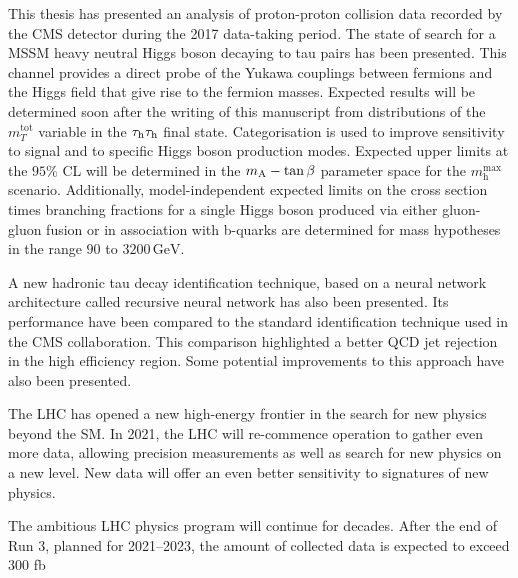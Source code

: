 This thesis has presented an analysis of proton-proton collision data recorded by the CMS detector during the 2017 data-taking period. The state of search for a MSSM heavy neutral Higgs boson decaying to tau pairs has been presented. This channel provides a direct probe of the Yukawa couplings between fermions and the Higgs field that give rise to the fermion masses. Expected results will be determined soon after the writing of this manuscript from distributions of the $m_{T}^{\mathrm{tot}}$ variable in the $\tau_{\rm h}\tau_{\rm h}$ final state. Categorisation is used to improve sensitivity to signal and to specific Higgs boson production modes. Expected upper limits at the $95\%$ CL will be determined in the $m_{\mathrm{A}}-\mathrm{tan}\,\beta$ parameter space for the $m_{\mathrm{h}}^{\mathrm{max}}$ scenario. Additionally, model-independent expected limits on the cross section times branching fractions for a single Higgs boson produced via either gluon-gluon fusion or in association with b-quarks are determined for mass hypotheses in the range $90$ to $3200\,\mathrm{GeV}$.

A new hadronic tau decay identification technique, based on a neural network architecture called recursive neural network has also been presented. Its performance have been compared to the standard identification technique used in the CMS collaboration. This comparison highlighted a better QCD jet rejection in the high \tauh efficiency region. Some potential improvements to this approach have also been presented.

The LHC has opened a new high-energy frontier in the search for new physics beyond the SM. In 2021, the LHC will re-commence operation to gather even more data, allowing precision measurements as well as search for new physics on a new level. New data will offer an even better sensitivity to signatures of new physics.


The ambitious LHC physics program will continue for decades. After the end of Run 3,
planned for 2021–2023, the amount of collected data is expected to exceed 300
fb
